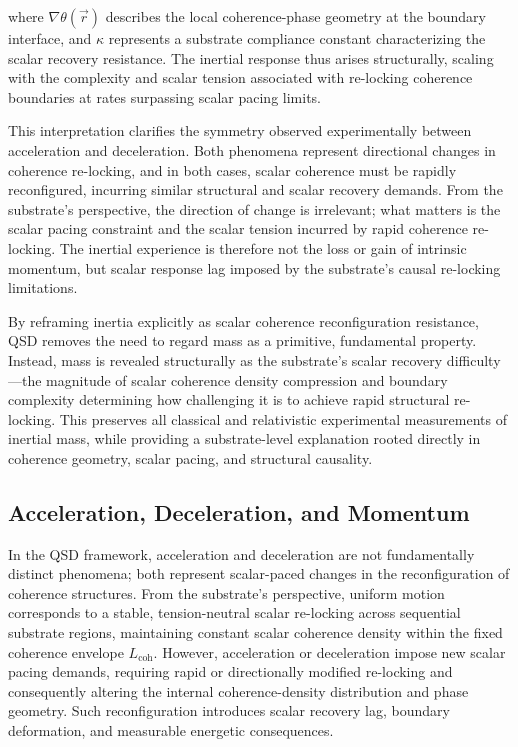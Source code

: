 \documentclass[preprints,article,submit,pdftex,moreauthors]{Definitions/mdpi}
\begin{document}
where \(\nabla \theta(\vec{r})\) describes the local coherence-phase geometry at the boundary interface, and \(\kappa\) represents a substrate compliance constant characterizing the scalar recovery resistance. The inertial response thus arises structurally, scaling with the complexity and scalar tension associated with re-locking coherence boundaries at rates surpassing scalar pacing limits.

This interpretation clarifies the symmetry observed experimentally between acceleration and deceleration. Both phenomena represent directional changes in coherence re-locking, and in both cases, scalar coherence must be rapidly reconfigured, incurring similar structural and scalar recovery demands. From the substrate’s perspective, the direction of change is irrelevant; what matters is the scalar pacing constraint and the scalar tension incurred by rapid coherence re-locking. The inertial experience is therefore not the loss or gain of intrinsic momentum, but scalar response lag imposed by the substrate’s causal re-locking limitations.

By reframing inertia explicitly as scalar coherence reconfiguration resistance, QSD removes the need to regard mass as a primitive, fundamental property. Instead, mass is revealed structurally as the substrate's scalar recovery difficulty—the magnitude of scalar coherence density compression and boundary complexity determining how challenging it is to achieve rapid structural re-locking. This preserves all classical and relativistic experimental measurements of inertial mass, while providing a substrate-level explanation rooted directly in coherence geometry, scalar pacing, and structural causality.


\subsection{Acceleration, Deceleration, and Momentum}

In the QSD framework, acceleration and deceleration are not fundamentally distinct phenomena; both represent scalar-paced changes in the reconfiguration of coherence structures. From the substrate’s perspective, uniform motion corresponds to a stable, tension-neutral scalar re-locking across sequential substrate regions, maintaining constant scalar coherence density within the fixed coherence envelope \(L_{\text{coh}}\). However, acceleration or deceleration impose new scalar pacing demands, requiring rapid or directionally modified re-locking and consequently altering the internal coherence-density distribution and phase geometry. Such reconfiguration introduces scalar recovery lag, boundary deformation, and measurable energetic consequences.
\end{document}
